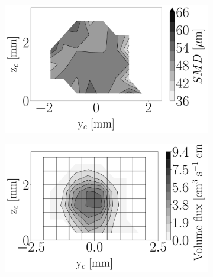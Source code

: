 \begin{figure}[h!]
\centering
\begin{subfigure}[b]{0.3\textwidth}
	\centering
   \includegraphics[scale=\scaleSLIBIMER]{./part3_applications/figures_ch8_resolved/injectors_SLI/dx15_xD06p67_SMD_map}
\end{subfigure}
   \hspace{0.17in}
\begin{subfigure}[b]{0.3\textwidth}
	\centering
   \includegraphics[scale=\scaleSLIBIMER]{./part3_applications/figures_ch8_resolved/injectors_SLI/dx15_xD06p67_volume_flux_map}
\end{subfigure}
   \hspace{0.17in}
\begin{subfigure}[b]{0.3\textwidth}
	\centering

\end{subfigure}
\end{figure}
